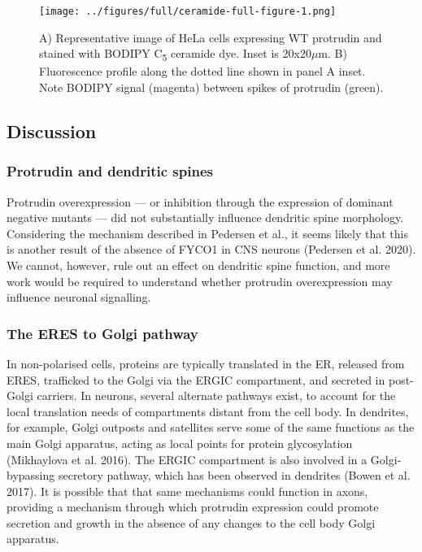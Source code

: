 \documentclass[
]{article}
\begin{document}
\begin{figure}
\centering
\texttt{[image: ../figures/full/ceramide-full-figure-1.png]}
\caption{A) Representative image of HeLa cells expressing WT protrudin
and stained with BODIPY C\textsubscript{5} ceramide dye. Inset is
20x20\(\mu\)m. B) Fluorescence profile along the dotted line shown in
panel A inset. Note BODIPY signal (magenta) between spikes of protrudin
(green).}
\end{figure}

\hypertarget{discussion}{%
\subsection{Discussion}\label{discussion}}

\hypertarget{protrudin-and-dendritic-spines}{%
\subsubsection{Protrudin and dendritic
spines}\label{protrudin-and-dendritic-spines}}

Protrudin overexpression --- or inhibition through the expression of
dominant negative mutants --- did not substantially influence dendritic
spine morphology. Considering the mechanism described in Pedersen et
al., it seems likely that this is another result of the absence of FYCO1
in CNS neurons (Pedersen et al. 2020). We cannot, however, rule out an
effect on dendritic spine function, and more work would be required to
understand whether protrudin overexpression may influence neuronal
signalling.

\hypertarget{the-eres-to-golgi-pathway}{%
\subsubsection{The ERES to Golgi
pathway}\label{the-eres-to-golgi-pathway}}

In non-polarised cells, proteins are typically translated in the ER,
released from ERES, trafficked to the Golgi via the ERGIC compartment,
and secreted in post-Golgi carriers. In neurons, several alternate
pathways exist, to account for the local translation needs of
compartments distant from the cell body. In dendrites, for example,
Golgi outposts and satellites serve some of the same functions as the
main Golgi apparatus, acting as local points for protein glycosylation
(Mikhaylova et al. 2016). The ERGIC compartment is also involved in a
Golgi-bypassing secretory pathway, which has been observed in dendrites
(Bowen et al. 2017). It is possible that that same mechanisms could
function in axons, providing a mechanism through which protrudin
expression could promote secretion and growth in the absence of any
changes to the cell body Golgi apparatus.
\end{document}
